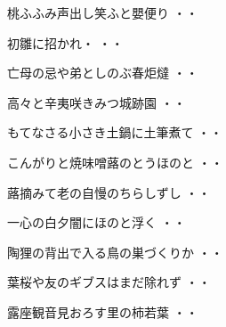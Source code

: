 \begin{shiika}桃ふふみ声出し笑ふと嬰便り
\hfill{・・}\end{shiika}
\vspace{0.6cm}
\begin{shiika}初雛に招かれ・
\hfill{・・}\end{shiika}
\vspace{0.6cm}
\begin{shiika}亡母の忌や弟としのぶ春炬燵
\hfill{・・}\end{shiika}
\vspace{0.6cm}
\begin{shiika}高々と辛夷咲きみつ城跡園
\hfill{・・}\end{shiika}
\vspace{0.6cm}
\begin{shiika}もてなさる小さき土鍋に土筆煮て
\hfill{・・}\end{shiika}
\vspace{0.6cm}
\begin{shiika}こんがりと焼味噌蕗のとうほのと
\hfill{・・}\end{shiika}
\vspace{0.6cm}
\begin{shiika}蕗摘みて老の自慢のちらしずし
\hfill{・・}\end{shiika}
\vspace{0.6cm}
\begin{shiika}一心の白夕闇にほのと浮く
\hfill{・・}\end{shiika}
\vspace{0.6cm}
\begin{shiika}陶狸の背出で入る鳥の巣づくりか
\hfill{・・}\end{shiika}
\vspace{0.6cm}
\begin{shiika}葉桜や友のギブスはまだ除れず
\hfill{・・}\end{shiika}
\vspace{0.6cm}
\begin{shiika}露座観音見おろす里の柿若葉
\hfill{・・}\end{shiika}
\vspace{0.6cm}
